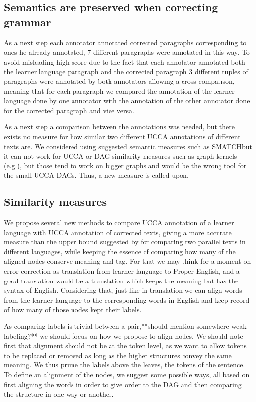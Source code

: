 \documentclass[english]{article}
\begin{document}
\subsection{Semantics are preserved when correcting grammar}

As a next step each annotator annotated corrected paragraphs corresponding
to ones he already annotated, 7 different paragraphs were annotated
in this way. To avoid misleading high score due to the fact that each
annotator annotated both the learner language paragraph and the corrected
paragraph 3 different tuples of paragraphs were annotated by both
annotators allowing a cross comparison, meaning that for each paragraph
we compared the annotation of the learner language done by one annotator
with the annotation of the other annotator done for the corrected
paragraph and vice versa. 

As a next step a comparison between the annotations was needed, but
there exists no measure for how similar two different UCCA annotations
of different texts are. We considered using suggested semantic measures
such as SMATCH\cite{cai2013smatch}but it can not work for UCCA or
DAG similarity measures such as graph kernels (e.g.\cite{kashima2003marginalized}),
but those tend to work on bigger graphs and would be the wrong tool
for the small UCCA DAGs. Thus, a new measure is called upon.

\subsection{Similarity measures\label{subsec:Similarity-measures}}

We propose several new methods to compare UCCA annotation of a learner\\
language with UCCA annotation of corrected texts, giving a more accurate
measure than the upper bound suggested by \cite{sulem2015conceptual}for
comparing two parallel texts in different languages, while keeping
the essence of comparing how many of the aligned nodes conserve meaning
and tag. For that we may think for a moment on error correction as
translation from learner language to Proper English, and a good translation
would be a translation which keeps the meaning but has the syntax
of English. Considering that, just like in translation we can align
words from the learner language to the corresponding words in English
and keep record of how many of those nodes kept their labels.

As comparing labels is trivial between a pair,{*}{*}should mention
somewhere weak labeling?{*}{*} we should focus on how we propose to
align nodes. We should note first that alignment should not be at
the token level, as we want to allow tokens to be replaced or removed
as long as the higher structures convey the same meaning. We thus
prune the labels above the leaves, the tokens of the sentence. To
define an alignment of the nodes, we suggest some possible ways, all
based on first aligning the words in order to give order to the DAG
and then comparing the structure in one way or another.
\end{document}
